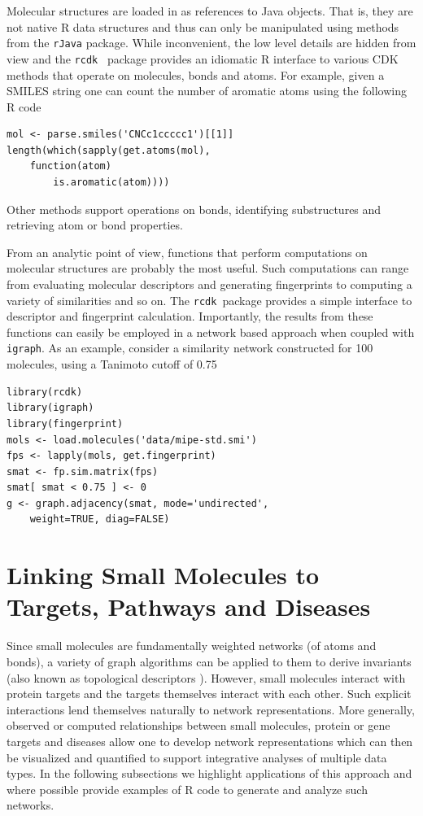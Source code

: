 \documentclass[12pt,letterpaper]{article}
\newcommand{\rcdk}{\texttt{rcdk}\ }
\begin{document}
Molecular structures are loaded in as references to Java objects. That
is, they are not native R data structures and thus can only be
manipulated using methods from the \texttt{rJava} package. While
inconvenient, the low level details are hidden from view and the \rcdk
package provides an idiomatic R interface to various CDK methods that
operate on molecules, bonds and atoms. For example, given a SMILES
string one can count the number of aromatic atoms using the following
R code
\begin{lstlisting}
mol <- parse.smiles('CNCc1ccccc1')[[1]]
length(which(sapply(get.atoms(mol), 
    function(atom) 
        is.aromatic(atom))))  
\end{lstlisting}
Other methods support operations on bonds, identifying substructures
and retrieving atom or bond properties.

From an analytic point of view, functions that perform computations on
molecular structures are probably the most useful. Such computations
can range from evaluating molecular descriptors \cite{Guha:2012vn} and
generating fingerprints to computing a variety of similarities and so
on. The \rcdk package provides a simple interface to descriptor and
fingerprint calculation. Importantly, the results from these functions
can easily be employed in a network based approach when coupled with
\texttt{igraph}. As an example, consider a similarity network
constructed for 100 molecules, using a Tanimoto cutoff of 0.75

\begin{lstlisting}
library(rcdk)
library(igraph)
library(fingerprint)
mols <- load.molecules('data/mipe-std.smi')
fps <- lapply(mols, get.fingerprint)
smat <- fp.sim.matrix(fps)
smat[ smat < 0.75 ] <- 0
g <- graph.adjacency(smat, mode='undirected', 
    weight=TRUE, diag=FALSE)  
\end{lstlisting}

\section{Linking Small Molecules to Targets, Pathways and Diseases}
\label{sec:link-small-molec}

Since small molecules are fundamentally weighted networks (of atoms
and bonds), a variety of graph algorithms can be applied to them to
derive invariants (also known as topological descriptors
\cite{Guha:2012vn}). However, small molecules interact with protein
targets and the targets themselves interact with each other. Such
explicit interactions lend themselves naturally to network
representations. More generally, observed or computed relationships
between small molecules, protein or gene targets and diseases allow
one to develop network representations which can then be visualized
and quantified to support integrative analyses of multiple data
types. In the following subsections we highlight applications of this
approach and where possible provide examples of R code to generate and
analyze such networks.
\end{document}

